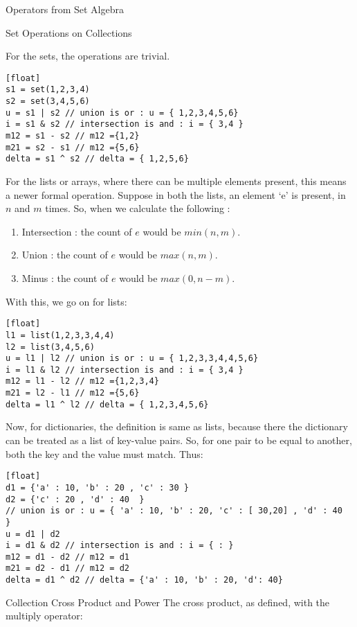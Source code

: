 \begin{section}{Operators from Set Algebra}
\begin{subsection}{Set Operations on Collections}

For the sets, the operations are trivial.
\begin{lstlisting}[style=JexlStyle][float]
s1 = set(1,2,3,4)
s2 = set(3,4,5,6)
u = s1 | s2 // union is or : u = { 1,2,3,4,5,6}
i = s1 & s2 // intersection is and : i = { 3,4 }
m12 = s1 - s2 // m12 ={1,2}
m21 = s2 - s1 // m12 ={5,6}
delta = s1 ^ s2 // delta = { 1,2,5,6}
\end{lstlisting}

For the lists or arrays, where there can be multiple elements present, 
this means a newer formal operation.
Suppose in both the lists, an element `e' is present, in $n$ and $m$ times.
So, when we calculate the following :
\begin{enumerate}
\item{Intersection :
  the count of $e$ would be $min(n,m)$.
}
\item{Union :
  the count of $e$ would be $max(n,m)$.
}
\item{Minus :
  the count of $e$ would be $max(0,n-m)$.
}

\end{enumerate}
With this, we go on for lists:

\begin{lstlisting}[style=JexlStyle][float]
l1 = list(1,2,3,3,4,4)
l2 = list(3,4,5,6)
u = l1 | l2 // union is or : u = { 1,2,3,3,4,4,5,6}
i = l1 & l2 // intersection is and : i = { 3,4 }
m12 = l1 - l2 // m12 ={1,2,3,4}
m21 = l2 - l1 // m12 ={5,6}
delta = l1 ^ l2 // delta = { 1,2,3,4,5,6}
\end{lstlisting}

Now, for dictionaries, the definition is same as lists, 
because there the dictionary can be treated as a list of key-value pairs.
So, for one pair to be equal to another, both the key and the value must match.
Thus:

\begin{lstlisting}[style=JexlStyle][float]
d1 = {'a' : 10, 'b' : 20 , 'c' : 30 }
d2 = {'c' : 20 , 'd' : 40  }
// union is or : u = { 'a' : 10, 'b' : 20, 'c' : [ 30,20] , 'd' : 40  }
u = d1 | d2 
i = d1 & d2 // intersection is and : i = { : } 
m12 = d1 - d2 // m12 = d1 
m21 = d2 - d1 // m12 = d2
delta = d1 ^ d2 // delta = {'a' : 10, 'b' : 20, 'd': 40}
\end{lstlisting}
\end{subsection}

\begin{subsection}{Collection Cross Product and Power}
The cross product, as defined, with the multiply operator:


\end{subsection}
\end{section}
